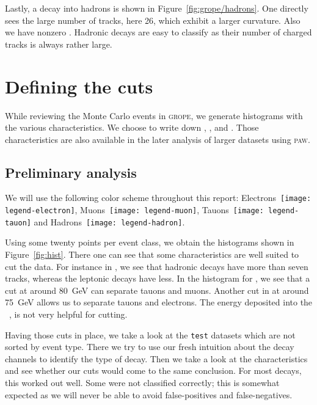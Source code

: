 \documentclass[11pt, english, fleqn, DIV=15, headinclude, BCOR=2cm]{scrreprt}
\begin{document}
Lastly, a decay into hadrons is shown in Figure~\ref{fig:grope/hadrons}. One
directly sees the large number of tracks, here 26, which exhibit a larger
curvature. Also we have nonzero \ehcal{}. Hadronic decays are easy to classify
as their number of charged tracks is always rather large.

\section{Defining the cuts}

While reviewing the Monte Carlo events in \textsc{grope}, we generate
histograms with the various characteristics. We choose to write down
\ncharged{}, \pcharged{}, \eecal{} and \ehcal{}. Those characteristics are also
available in the later analysis of larger datasets using \textsc{paw}.

\subsection{Preliminary analysis}

We will use the following color scheme throughout this report:
Electrons~\texttt{[image: legend-electron]},
Muons~\texttt{[image: legend-muon]},
Tauons~\texttt{[image: legend-tauon]} and
Hadrons~\texttt{[image: legend-hadron]}.

Using some twenty points per event class, we obtain the histograms shown in
Figure~\ref{fig:hist}. There one can see that some characteristics are well
suited to cut the data. For instance in \ncharged, we see that hadronic decays
have more than seven tracks, whereas the leptonic decays have less. In the
histogram for \pcharged, we see that a cut at around \SI{80}{\giga\electronvolt}
can separate tauons and muons. Another cut in \eecal{} at around
\SI{75}{\giga\electronvolt} allows us to separate tauons and electrons. The
energy deposited into the \hcal\, \eecal, is not very helpful for cutting.



Having those cuts in place, we take a look at the \texttt{test} datasets which
are not sorted by event type. There we try to use our fresh intuition about the
decay channels to identify the type of decay. Then we take a look at the
characteristics and see whether our cuts would come to the same conclusion. For
most decays, this worked out well. Some were not classified correctly; this is
somewhat expected as we will never be able to avoid false-positives and
false-negatives.
\end{document}
